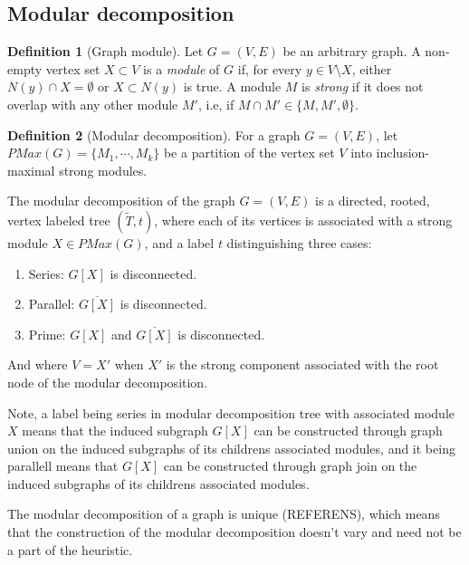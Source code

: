 \documentclass{amsart}
\theoremstyle{definition}
\newtheorem{definition}{Definition}
\begin{document}
\subsection{Modular decomposition}

\begin{definition}[Graph module]
    Let $G = (V,E)$ be an arbitrary graph. A non-empty vertex set $X \subset V$
    is a \textit{module} of $G$ if, for every $y \in V \setminus X$,  either
    $N(y) \cap X = \emptyset$ or $X \subset N(y)$ is true. A module $M$ is
    \textit{strong} if it does not overlap with any other module $M'$, i.e, if 
    $M \cap M' \in \{M,M',\emptyset \}$.
\end{definition}
   
\newpage
\begin{definition}[Modular decomposition]
    For a graph $G = (V,E)$, let $PMax(G) = \{M_1,\cdots,M_k\}$ be a partition of the vertex set $V$ 
    into inclusion-maximal strong modules.
    
    The modular decomposition of the graph $G = (V,E)$ is a directed, rooted, vertex labeled tree
    $(\widetilde{T},t)$, where each of its vertices is associated with a strong
    module $X \in PMax(G)$, and a label $t$ distinguishing  three cases:

    \begin{enumerate}
        \item Series: $G[X]$ is disconnected.
        \item Parallel: $\overline{G[X]}$ is disconnected.
        \item Prime: $G[X]$ and $\overline{G[X]}$ is disconnected.
    \end{enumerate}

    And where $V = X'$ when $X'$ is the strong component associated with the
    root node of the modular decomposition.
\end{definition}

Note, a label being series in modular decomposition tree with associated module
$X$ means that the induced subgraph $G[X]$ can be constructed through graph
union on the induced subgraphs of its childrens associated modules, and it being
parallell means that $G[X]$ can be constructed through graph join on the
induced subgraphs of its childrens associated modules.

The modular decomposition of a graph is unique (REFERENS), which means that the
construction of the modular decomposition doesn't vary and need not be a part of
the heuristic.
\end{document}
